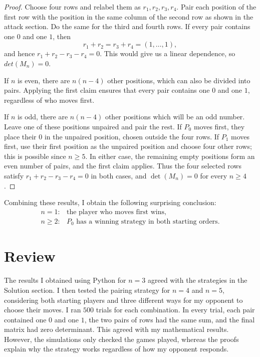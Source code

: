 \documentclass[11pt]{article}
\newcommand{\keywordfont}{\textsc}
\newcommand{\keyword}[1]{%
  \marginpar{\raggedright\small\keywordfont{#1}}}
\begin{document}
\begin{proof}
Choose four rows and relabel them
as $r_1,r_2,r_3,r_4$. Pair each position of the first row with the position in the same column of the second row as shown in the attack section. Do the same for the third and fourth rows. If every pair contains one $0$ and one $1$, then
$$ r_1+r_2=r_3+r_4=(1,\ldots,1), $$
and hence $r_1+r_2-r_3-r_4=0$. This would give us a linear dependence, so $det(M_n)=0$.

If $n$ is even, there are $n(n-4)$ other positions, which can also be divided into pairs. Applying the first claim ensures that every pair contains one $0$ and one $1$, regardless of who moves first.

If $n$ is odd, there are $n(n-4)$ other positions which will be an odd number. Leave one of these positions unpaired and pair the rest. If $P_0$ moves first, they place their $0$ in the unpaired position, chosen outside the four rows. If $P_1$ moves first, use their first position as the unpaired position and choose four other rows; this is possible since $n\geq5$. In either case, the remaining empty positions form an even number of pairs, and the first claim applies.
Thus the four selected rows satisfy $r_1+r_2-r_3-r_4=0$ in both cases, and $\det(M_n)=0$ for every $n\geq4$.
\end{proof}

Combining these results, I obtain the following surprising conclusion:
$$
\boxed{\begin{array}{ll}
n=1: & \text{the player who moves first wins},\\[2mm]
n\geq2: & P_0\text{ has a winning strategy in both starting orders}.
\end{array}}
$$


\section{Review}

\keyword{CHECK}
The results I obtained using Python
for $n=3$ agreed with the strategies
in the Solution section. I then tested
the pairing strategy for $n=4$ and
$n=5$, considering both starting
players and three different ways
for my opponent to choose their moves.
I ran $500$ trials for each combination.
In every trial, each pair contained
one $0$ and one $1$, the two pairs
of rows had the same sum, and the
final matrix had zero determinant.
This agreed with my mathematical
results. However, the simulations
only checked the games played,
whereas the proofs explain why
the strategy works regardless
of how my opponent responds.
\end{document}
